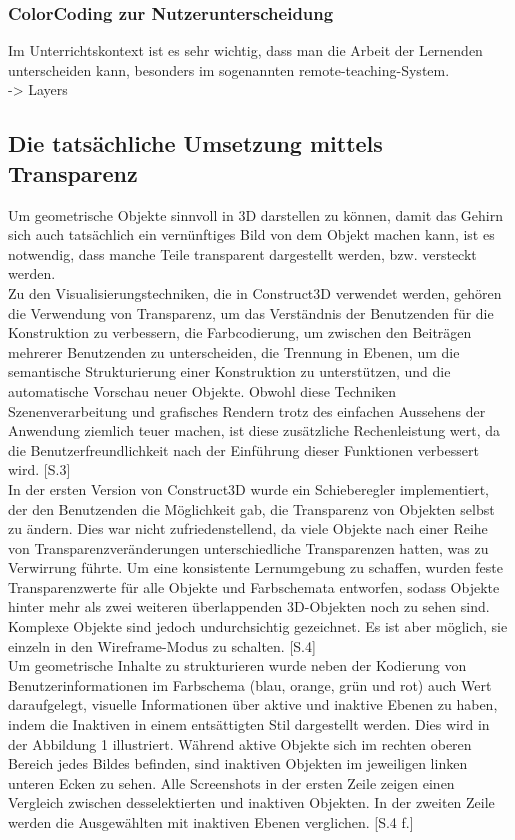 \documentclass[deutsch]{llncs}
\begin{document}
\subsubsection{ColorCoding zur Nutzerunterscheidung} 
Im Unterrichtskontext ist es sehr wichtig, dass man die Arbeit der Lernenden unterscheiden kann, besonders im sogenannten remote-teaching-System. \\
-> Layers

\subsection{Die tatsächliche Umsetzung mittels Transparenz}
\label{subsec:}
Um geometrische Objekte sinnvoll in 3D darstellen zu können, damit das Gehirn sich auch tatsächlich ein vernünftiges Bild von dem Objekt machen kann,
ist es notwendig, dass manche Teile transparent dargestellt werden, bzw. versteckt werden. \\
Zu den Visualisierungstechniken, die in Construct3D verwendet werden, gehören die Verwendung von Transparenz, um das Verständnis der 
Benutzenden für die Konstruktion zu verbessern, die Farbcodierung, um zwischen den Beiträgen mehrerer Benutzenden zu unterscheiden, 
die Trennung in Ebenen, um die semantische Strukturierung einer Konstruktion zu unterstützen, und die automatische Vorschau neuer Objekte. 
Obwohl diese Techniken Szenenverarbeitung und grafisches Rendern trotz des einfachen Aussehens der Anwendung ziemlich teuer machen, 
ist diese zusätzliche Rechenleistung wert, da die Benutzerfreundlichkeit nach der Einführung dieser Funktionen verbessert wird. [S.3]\\
In der ersten Version von Construct3D wurde ein Schieberegler implementiert, der den Benutzenden die Möglichkeit gab, die Transparenz von 
Objekten selbst zu ändern. Dies war nicht zufriedenstellend, da viele Objekte nach einer Reihe von Transparenzveränderungen unterschiedliche 
Transparenzen hatten, was zu Verwirrung führte. Um eine konsistente Lernumgebung zu schaffen, wurden feste Transparenzwerte für alle Objekte und
 Farbschemata entworfen, sodass Objekte hinter mehr als zwei weiteren überlappenden 3D-Objekten noch zu sehen sind. Komplexe Objekte sind 
jedoch undurchsichtig gezeichnet. Es ist aber möglich, sie einzeln in den Wireframe-Modus zu schalten. [S.4]
\noindent \\
Um geometrische Inhalte zu strukturieren wurde neben der Kodierung von Benutzerinformationen im Farbschema (blau, orange, grün und rot) auch 
Wert daraufgelegt, visuelle Informationen über aktive und inaktive Ebenen zu haben, indem die Inaktiven in einem entsättigten Stil dargestellt werden. 
Dies wird in der Abbildung 1 illustriert. Während aktive Objekte sich im rechten oberen Bereich jedes Bildes befinden, sind inaktiven Objekten im jeweiligen
 linken unteren Ecken zu sehen. Alle Screenshots in der ersten Zeile zeigen einen Vergleich zwischen desselektierten und inaktiven Objekten.
 In der zweiten Zeile werden die Ausgewählten mit inaktiven Ebenen verglichen. [S.4 f.]\\
\end{document}
